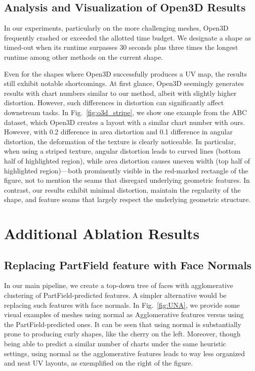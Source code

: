 \subsection{Analysis and Visualization of Open3D Results}
In our experiments, particularly on the more challenging meshes, Open3D frequently crashed or exceeded the allotted time budget. We designate a shape as timed-out when its runtime surpasses 30 seconds plus three times the longest runtime among other methods on the current shape. 

Even for the shapes where Open3D successfully produces a UV map, the results still exhibit notable shortcomings.
At first glance, Open3D seemingly generates results with chart numbers similar to our method, albeit with slightly higher distortion. However, such differences in distortion can significantly affect downstream tasks.
In Fig.~\ref{fig:o3d_stripe}, we show one example from the ABC dataset, which Open3D creates a layout with a similar chart number with ours. However, with 0.2 difference in area distortion and 0.1 difference in angular distortion, the deformation of the texture is clearly noticeable. In particular, when using a striped texture, angular distortion leads to curved lines (bottom half of highlighted region), while area distortion causes uneven width (top half of highlighted region)—both prominently visible in the red-marked rectangle of the figure, not to mention the seams that disregard underlying geometric features. In contrast, our results exhibit minimal distortion, maintain the regularity of the shape, and feature seams that largely respect the underlying geometric structure.

\section{Additional Ablation Results}

\subsection{Replacing PartField feature with Face Normals}

In our main pipeline, we create a top-down tree of faces with agglomerative clustering of PartField-predicted features. A simpler alternative would be replacing such features with face normals. In Fig.~\ref{fig:UNA}, we provide some visual examples of meshes using normal as Agglomerative features versus using the PartField-predicted ones. It can be seen that using normal is substantially prone to producing curly shapes, like the cherry on the left. Moreover, though being able to predict a similar number of charts under the same heuristic settings,  using normal as the agglomerative features leads to way less organized and neat UV layouts, as exemplified on the right of the figure.

